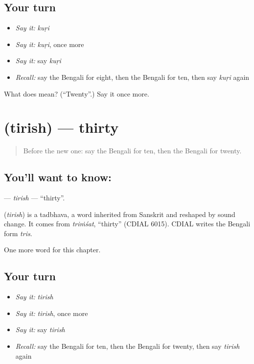 \subsection*{Your turn}
\begin{itemize}
\raggedright
  \item \emph{Say it:} \emph{kuṛi}
  \item \emph{Say it:} \emph{kuṛi}, once more
  \item \emph{Say it:} say \emph{kuṛi}
  \item \emph{Recall:} say the Bengali for eight, then the Bengali for ten, then say \emph{kuṛi} again
\end{itemize}

\begin{tcolorbox}[breakable,colback=teal!4,colframe=teal!35!black,title={Before you move on}]
What does  mean? (\textquotedblleft{}Twenty\textquotedblright{}.) Say it once more.
\end{tcolorbox}
\section[\texorpdfstring{\bn{তিরিশ} (tirish)}{তিরিশ (tirish)}]{ (tirish) — thirty}

\label{lesson:BN-C87-tirish}



\begin{quote}
Before the new one: say the Bengali for ten, then the Bengali for twenty.
\end{quote}

\subsection*{You'll want to know: }
\textbf{} — \emph{tirish} — \textquotedblleft{}thirty\textquotedblright{}.

\begin{cousinweb}
\textbf{} (\emph{tirish}) is a tadbhava, a word inherited from Sanskrit and reshaped by sound change. It comes from \emph{triṁśat}, \textquotedblleft{}thirty\textquotedblright{} (CDIAL 6015). CDIAL writes the Bengali form \emph{tris}.
\end{cousinweb}

\begin{grammarlens}[title={What you've built}]
One more word for this chapter.
\end{grammarlens}

\subsection*{Your turn}
\begin{itemize}
\raggedright
  \item \emph{Say it:} \emph{tirish}
  \item \emph{Say it:} \emph{tirish}, once more
  \item \emph{Say it:} say \emph{tirish}
  \item \emph{Recall:} say the Bengali for ten, then the Bengali for twenty, then say \emph{tirish} again
\end{itemize}

